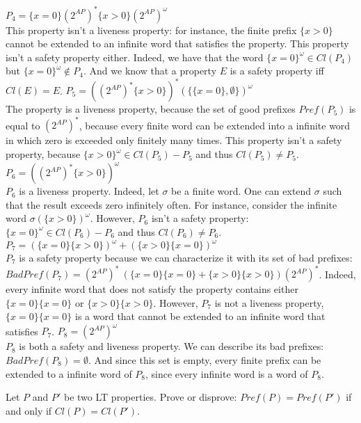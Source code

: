 \documentclass[11pt,a4paper]{article}
\newcommand\badp{\mathit{BadPref}}
\newcommand\pref{\mathit{Pref}}
\newcommand\twoap{2^{AP}}
\renewcommand\star{^*}
\newcommand\cl{\mathit{Cl}}
\begin{document}
\begin{Answer}
  \Question%
  $P_4 = \{x = 0\}(\twoap)\star\{x > 0\}(\twoap)^\omega$\\
This property isn't a liveness property: for instance, the finite prefix $\{x>0\}$ cannot be extended to an infinite word that satisfies the property.
This property isn't a safety property either. Indeed, we have that the word ${\{x=0\}}^\omega\in\cl(P_4)$ but ${\{x=0\}}^\omega\not\in P_4$. And we know that a property $E$ is a safety property iff $\cl(E)=E$.
  \Question%
  $P_5 = ((\twoap)\star\{x > 0\})\star(\{\{x=0\},\emptyset\})^\omega$\\  
The property is a liveness property, because the set of good prefixes $\pref(P_5)$ is equal to $(\twoap)\star$, because  every finite word can be extended into a infinite word in which zero is exceeded only finitely many times. This property isn't a safety property, because ${\{x>0\}}^\omega\in\cl(P_5)-P_5$ and thus $\cl(P_5)\neq P_5$.
  \Question%
  $P_6 = ((\twoap)\star\{x > 0\})^\omega$\\
$P_6$ is a liveness property. Indeed, let $\sigma$ be a finite word. One can extend $\sigma$ such that the result exceeds zero infinitely often. For instance, consider the infinite word ${\sigma(\{x>0\})}^\omega$.
However, $P_6$ isn't a safety property: ${\{x=0\}}^\omega\in\cl(P_6)-P_6$ and thus $\cl(P_6)\neq P_6$.
  \Question%
  $P_7 = (\{x = 0\}\{x > 0\})^\omega + (\{x > 0\}\{x = 0\})^\omega$\\
$P_7$ is a safety property because we can characterize it with its set of bad prefixes: $\badp(P_7)=(\twoap)\star\ (\{x=0\}\{x=0\} + \{x>0\}\{x>0\}) (\twoap)\star$. Indeed, every infinite word that does not satisfy the property contains either $\{x=0\}\{x=0\}$ or $\{x>0\}\{x>0\}$.
However, $P_7$ is not a liveness property, $\{x=0\}\{x=0\}$ is a word that cannot be extended to an infinite word that satisfies $P_7$.
  \Question%
  $P_8 = (\twoap)^\omega$\\
$P_8$ is both a safety and liveness property. We can describe its bad prefixes: $\badp(P_8)=\emptyset$. And since this set is empty, every finite prefix can be extended to a infinite word of $P_8$, since every infinite word is a word of $P_8$.
\end{Answer}

\begin{Exercise}

Let $P$ and $P'$ be two LT properties. Prove or disprove: $Pref(P) = Pref(P')$ if and only if $Cl(P) = Cl(P')$.
\end{Exercise}
\end{document}
